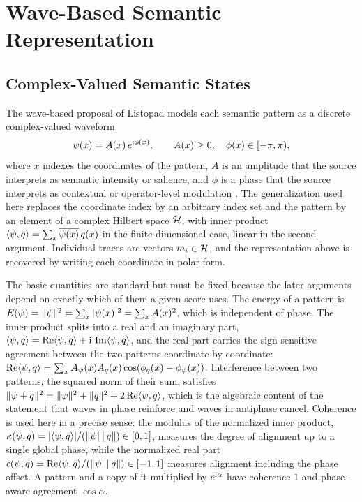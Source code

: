 \part{Wave-Based Semantic Representation}

\chapter{Complex-Valued Semantic States}\label{ch:complex}

The wave-based proposal of Listopad models each semantic pattern as a discrete complex-valued waveform
\begin{equation}\label{eq:wave}
\psi(x)=A(x)\,e^{\mathrm{i}\phi(x)},\qquad A(x)\ge 0,\quad \phi(x)\in[-\pi,\pi),
\end{equation}
where $x$ indexes the coordinates of the pattern, $A$ is an amplitude that the source interprets as semantic intensity or salience, and $\phi$ is a phase that the source interprets as contextual or operator-level modulation \cite{listopad2025}. The generalization used here replaces the coordinate index by an arbitrary index set and the pattern by an element of a complex Hilbert space $\mathcal{H}$, with inner product $\langle \psi,q\rangle=\sum_x\overline{\psi(x)}\,q(x)$ in the finite-dimensional case, linear in the second argument. Individual traces are vectors $m_i\in\mathcal{H}$, and the representation above is recovered by writing each coordinate in polar form.

The basic quantities are standard but must be fixed because the later arguments depend on exactly which of them a given score uses. The energy of a pattern is $E(\psi)=\lVert \psi\rVert^2=\sum_x|\psi(x)|^2=\sum_xA(x)^2$, which is independent of phase. The inner product splits into a real and an imaginary part, $\langle \psi,q\rangle=\operatorname{Re}\langle \psi,q\rangle+\mathrm{i}\,\operatorname{Im}\langle \psi,q\rangle$, and the real part carries the sign-sensitive agreement between the two patterns coordinate by coordinate: $\operatorname{Re}\langle \psi,q\rangle=\sum_xA_\psi(x)A_q(x)\cos(\phi_q(x)-\phi_\psi(x))$. Interference between two patterns, the squared norm of their sum, satisfies $\lVert \psi+q\rVert^2=\lVert \psi\rVert^2+\lVert q\rVert^2+2\operatorname{Re}\langle \psi,q\rangle$, which is the algebraic content of the statement that waves in phase reinforce and waves in antiphase cancel. Coherence is used here in a precise sense: the modulus of the normalized inner product, $\kappa(\psi,q)=|\langle \psi,q\rangle|/(\lVert \psi\rVert\lVert q\rVert)\in[0,1]$, measures the degree of alignment up to a single global phase, while the normalized real part $c(\psi,q)=\operatorname{Re}\langle \psi,q\rangle/(\lVert \psi\rVert\lVert q\rVert)\in[-1,1]$ measures alignment including the phase offset. A pattern and a copy of it multiplied by $e^{\mathrm{i}\alpha}$ have coherence $1$ and phase-aware agreement $\cos\alpha$.

